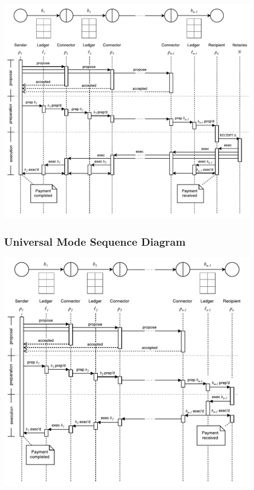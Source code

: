 \documentclass[letterpaper,twocolumn,10pt]{article}
\begin{document}
\begin{minipage}{\textwidth}
    \centering
    \includegraphics[width=\textwidth]{figures/atomic-sequence.pdf}
\end{minipage}

\clearpage

\subsection{Universal Mode Sequence Diagram}
\label{sec:universal-sequence}

\begin{minipage}{\textwidth}
    \centering
    \includegraphics[width=\textwidth]{figures/universal-sequence.pdf}
\end{minipage}
\end{document}

